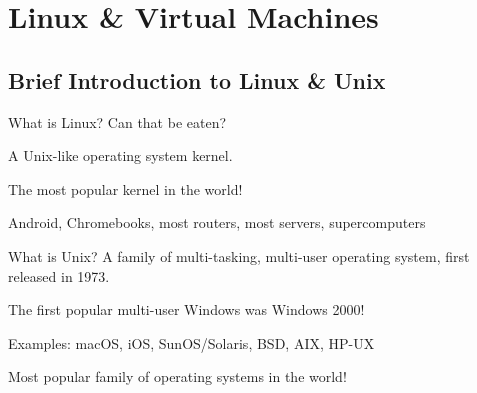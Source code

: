 \documentclass[12pt]{beamer}
\begin{document}
\section{Linux \& Virtual Machines}
\subsection{Brief Introduction to Linux \& Unix}

\begin{frame}{What is Linux?}
  Can that be eaten? \pause

  A Unix-like operating system kernel.

  The most popular kernel in the world!

  Android, Chromebooks, most routers, most servers, supercomputers
\end{frame}

\begin{frame}{What is Unix?}
  A family of multi-tasking, multi-user operating system, first released in 1973.

  The first popular multi-user Windows was Windows 2000!

  Examples: macOS, iOS, SunOS/Solaris, BSD, AIX, HP-UX

  Most popular family of operating systems in the world!
\end{frame}
\end{document}

